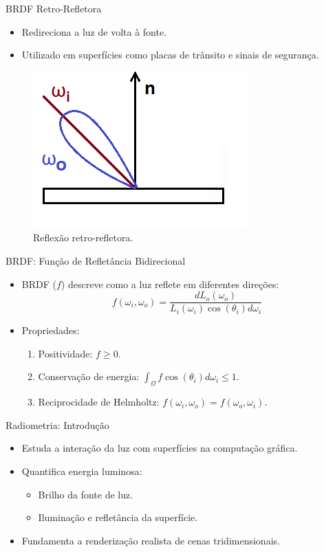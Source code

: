 \begin{frame}{BRDF Retro-Refletora}
    \begin{itemize}
        \item Redireciona a luz de volta à fonte.
        \item Utilizado em superfícies como placas de trânsito e sinais de segurança.
    \end{itemize}
    \begin{figure}[H]
        \centering
        \includegraphics[scale=0.5]{./Imagens/retro-reflection-2d.png}
        \caption{\small Reflexão retro-refletora.}
    \end{figure}
\end{frame}

\begin{frame}{BRDF: Função de Refletância Bidirecional}
    \begin{itemize}
        \item BRDF (\( f \)) descreve como a luz reflete em diferentes direções:
        \[
        f(\omega_i, \omega_o) = \frac{dL_o(\omega_o)}{L_i(\omega_i) \cos(\theta_i) d\omega_i}
        \]
        \item Propriedades:
        \begin{enumerate}
            \item Positividade: \( f \geq 0 \).  
            \item Conservação de energia: \(\int_{\Omega} f \cos(\theta_i) d\omega_i \leq 1\).
            \item Reciprocidade de Helmholtz: \( f(\omega_i, \omega_o) = f(\omega_o, \omega_i) \).
        \end{enumerate}
    \end{itemize}
\end{frame}

\begin{frame}{Radiometria: Introdução}
    \begin{itemize}
        \item Estuda a interação da luz com superfícies na computação gráfica.
        \item Quantifica energia luminosa:
        \begin{itemize}
            \item Brilho da fonte de luz.
            \item Iluminação e refletância da superfície.
        \end{itemize}
        \item Fundamenta a renderização realista de cenas tridimensionais.
    \end{itemize}
\end{frame}

